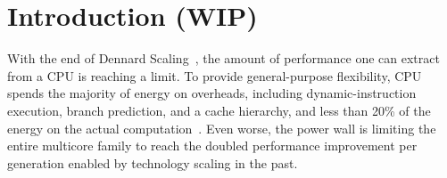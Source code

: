 \chapter{Introduction (WIP)}

With the end of Dennard Scaling~\cite{dennard}, the amount of performance one can extract from a CPU is reaching a limit.
To provide general-purpose flexibility, CPU spends the majority of energy on overheads, including dynamic-instruction execution, branch prediction, and a cache hierarchy, and less than 20\% of the energy on the actual computation~\cite{mark}.
Even worse, the power wall is limiting the entire multicore family
to reach the doubled performance improvement per generation enabled by technology scaling in the past\cite{multicorescale}.
